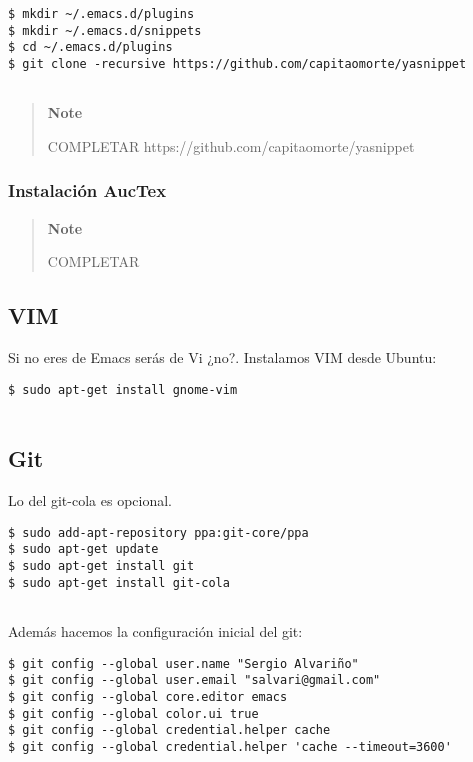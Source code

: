\begin{verbatim}
$ mkdir ~/.emacs.d/plugins
$ mkdir ~/.emacs.d/snippets
$ cd ~/.emacs.d/plugins
$ git clone -recursive https://github.com/capitaomorte/yasnippet
        
\end{verbatim}

\begin{quote}
\textbf{Note}

COMPLETAR https://github.com/capitaomorte/yasnippet
\end{quote}

\subsubsection{Instalación AucTex}\label{instalaciuxf3n-auctex}

\begin{quote}
\textbf{Note}

COMPLETAR
\end{quote}

\subsection{VIM}\label{vim}

Si no eres de Emacs serás de Vi ¿no?. Instalamos VIM desde Ubuntu:

\begin{verbatim}
$ sudo apt-get install gnome-vim
      
\end{verbatim}

\subsection{Git}\label{git}

Lo del git-cola es opcional.

\begin{verbatim}
$ sudo add-apt-repository ppa:git-core/ppa
$ sudo apt-get update
$ sudo apt-get install git
$ sudo apt-get install git-cola
      
\end{verbatim}

Además hacemos la configuración inicial del git:

\begin{verbatim}
$ git config --global user.name "Sergio Alvariño"
$ git config --global user.email "salvari@gmail.com"
$ git config --global core.editor emacs
$ git config --global color.ui true
$ git config --global credential.helper cache
$ git config --global credential.helper 'cache --timeout=3600'
      
\end{verbatim}

